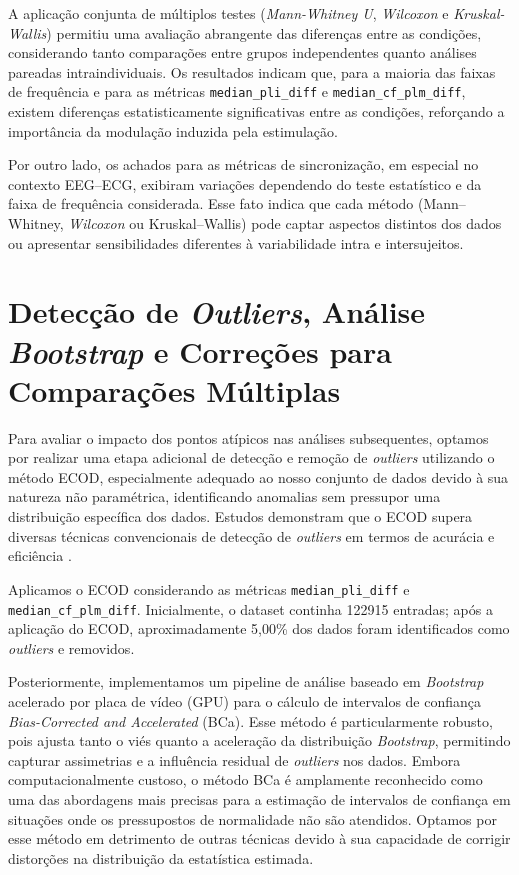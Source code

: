 A aplicação conjunta de múltiplos testes (\textit{Mann-Whitney U}, \textit{Wilcoxon} e \textit{Kruskal-Wallis}) permitiu uma avaliação abrangente das diferenças entre as condições, considerando tanto comparações entre grupos independentes quanto análises pareadas intraindividuais. Os resultados indicam que, para a maioria das faixas de frequência e para as métricas \texttt{median\_pli\_diff} e \texttt{median\_cf\_plm\_diff}, existem diferenças estatisticamente significativas entre as condições, reforçando a importância da modulação induzida pela estimulação.

Por outro lado, os achados para as métricas de sincronização, em especial no contexto EEG–ECG, exibiram variações dependendo do teste estatístico e da faixa de frequência considerada. Esse fato indica que cada método (Mann–Whitney, \textit{Wilcoxon} ou Kruskal–Wallis) pode captar aspectos distintos dos dados ou apresentar sensibilidades diferentes à variabilidade intra e intersujeitos.

\section{Detecção de \textit{Outliers}, Análise \textit{Bootstrap} e Correções para Comparações Múltiplas}
Para avaliar o impacto dos pontos atípicos nas análises subsequentes, optamos por realizar uma etapa adicional de detecção e remoção de \textit{outliers} utilizando o método ECOD, especialmente adequado ao nosso conjunto de dados devido à sua natureza não paramétrica, identificando anomalias sem pressupor uma distribuição específica dos dados. Estudos demonstram que o ECOD supera diversas técnicas convencionais de detecção de \textit{outliers} em termos de acurácia e eficiência \cite{li2022ecod}.

Aplicamos o ECOD considerando as métricas \texttt{median\_pli\_diff} e \texttt{median\_cf\_plm\_diff}. Inicialmente, o dataset continha 122915 entradas; após a aplicação do ECOD, aproximadamente 5,00\% dos dados foram identificados como \textit{outliers} e removidos.

Posteriormente, implementamos um pipeline de análise baseado em \textit{Bootstrap} acelerado por placa de vídeo (GPU) para o cálculo de intervalos de confiança \textit{Bias-Corrected and Accelerated} (BCa). Esse método é particularmente robusto, pois ajusta tanto o viés quanto a aceleração da distribuição \textit{Bootstrap}, permitindo capturar assimetrias e a influência residual de \textit{outliers} nos dados. Embora computacionalmente custoso, o método BCa é amplamente reconhecido como uma das abordagens mais precisas para a estimação de intervalos de confiança em situações onde os pressupostos de normalidade não são atendidos. Optamos por esse método em detrimento de outras técnicas devido à sua capacidade de corrigir distorções na distribuição da estatística estimada.

